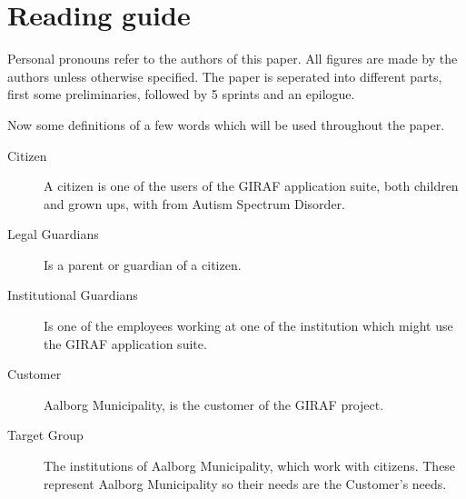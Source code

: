 \section*{Reading guide}

Personal pronouns refer to the authors of this paper. 
All figures are made by the authors unless otherwise specified.
The paper is seperated into different parts, first some preliminaries, followed by 5 sprints and an epilogue.

Now some definitions of a few words which will be used throughout the paper.

\begin{description}
	\item[Citizen] A citizen is one of the users of the GIRAF application suite, both children and grown ups, with from Autism Spectrum Disorder.
	\item[Legal Guardians] Is a parent or guardian of a citizen.
	\item[Institutional Guardians] Is one of the employees working at one of the institution which might use the GIRAF application suite.
	\item[Customer] Aalborg Municipality, is the customer of the GIRAF project.
	\item[Target Group] The institutions of Aalborg Municipality, which work with citizens. These represent Aalborg Municipality so their needs are the Customer's needs.
\end{description}


\newpage

